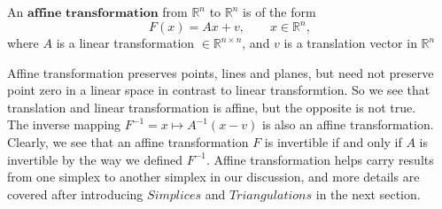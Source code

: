       \begin{definition*}
      An $\textbf{affine transformation}$ from $\mathbb{R}^n$ to $\mathbb{R}^n$ is of the form\\
      \begin{equation*}
      {F}(x) = {Ax} + {v}, \qquad {x}\in\mathbb{R}^n,
      \end{equation*}
      where ${A}$ is a linear transformation $\in\mathbb{R}^{n\times n}$, and  ${v}$ is a translation vector in $\mathbb{R}^n$\\
      \end{definition*}
      Affine transformation preserves points, lines and planes, but need not preserve point zero in a linear space in contrast to linear transformtion. So we see that translation and linear transformation is affine, but the opposite is not true.\\
      \indent
      The inverse mapping $F^{-1} = {x} \mapsto {A}^{-1}({x} - {v})$ is also an affine transformation. Clearly, we see that an affine transformation ${F}$ is invertible if and only if ${A}$ is invertible by the way we defined ${F}^{-1}$. Affine transformation helps carry results from one simplex to another simplex in our discussion, and more details are covered after introducing ${Simplices}$ and ${Triangulations}$ in the next section.